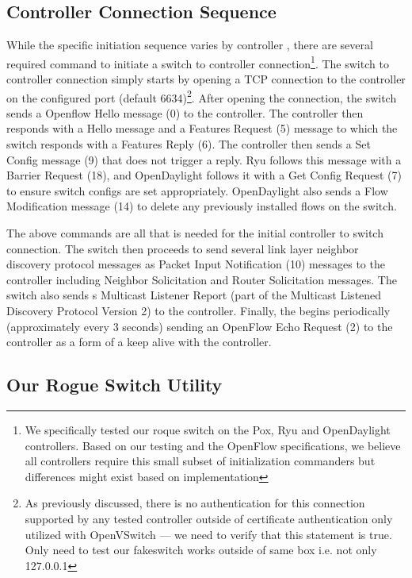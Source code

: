 \subsection {Controller Connection Sequence}
While the specific initiation sequence varies by controller , there are several required command to initiate a switch to controller connection\footnote{We specifically tested our roque switch on the Pox, Ryu and OpenDaylight controllers. Based on our testing and the OpenFlow specifications, we believe all controllers require this small subset of initialization commanders but differences might exist based on implementation}. The switch to controller connection simply starts by opening a TCP connection to the controller on the configured port (default 6634)\footnote{As previously discussed, there is no authentication for this connection supported by any tested controller outside of certificate authentication only utilized with OpenVSwitch --- we need to verify that this statement is true. Only need to test our fakeswitch works outside of same box i.e. not only 127.0.0.1}.  After opening the connection, the switch sends a Openflow Hello message (0) to the controller. The controller then responds with a Hello message and a Features Request (5) message to which the switch responds with a  Features Reply (6). The controller then sends a Set Config message (9) that does not trigger a reply. Ryu follows this message with a Barrier Request (18), and OpenDaylight follows it with a  Get Config Request (7) to ensure switch configs are set appropriately. OpenDaylight also sends a Flow Modification message (14) to delete any previously installed flows on the switch.

The above commands are all that is needed for the initial controller to switch connection. The switch then proceeds to send several link layer neighbor discovery protocol messages as Packet Input Notification (10) messages to the controller including  Neighbor Solicitation and Router Solicitation messages. The switch also sends s Multicast Listener Report (part of the Multicast Listened Discovery Protocol Version 2) to the controller. Finally, the begins periodically (approximately every 3 seconds) sending an OpenFlow Echo Request (2) to the controller as a form of a keep alive with the controller.

\subsection{Our Rogue Switch Utility}